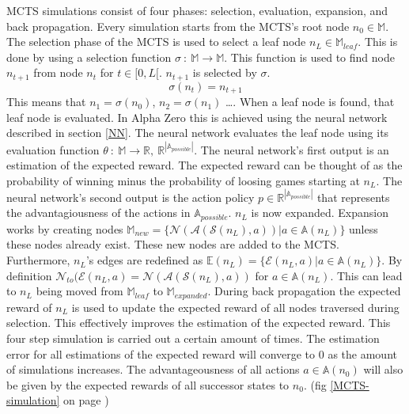 \documentclass[12pt]{article}
\newcommand{\imgRef}[1]{(fig \ref{#1} on page \pageref{#1})}
\begin{document}
MCTS simulations consist of four phases: selection, evaluation, expansion, and back propagation. Every simulation starts from the MCTS's root node \(n_0 \in \mathbb{M}\). The selection phase of the MCTS is used to select a leaf node \(n_L \in \mathbb{M}_{leaf}\). This is done by using a selection function \(\sigma~:~\mathbb{M}\to\mathbb{M}\). This function is used to find node \(n_{t+1}\) from node \(n_t\) for \(t\in [0,L[\). \(n_{t+1}\) is selected by \(\sigma\).
\begin{equation}
\sigma(n_t) = n_{t+1}
\end{equation}
 This means that \(n_1 = \sigma(n_0)\), \(n_2 =  \sigma(n_1)\) \dots. When a leaf node is found, that leaf node is evaluated. In Alpha Zero this is achieved using the neural network described in section \ref{NN}. The neural network evaluates the leaf node using its evaluation function \(\theta~:~\mathbb{M}\to \mathbb{R},~\mathbb{R}^{|\mathbb{A}_{possible}|}\). The neural network's first output is an estimation of the expected reward. The expected reward can be thought of as the probability of winning minus the probability of loosing games starting at \(n_L\). The neural network's second output is the action policy \(p\in\mathbb{R}^{|\mathbb{A}_{possible}|}\) that represents the advantagiousness of the actions in \(\mathbb{A}_{possible}\). \(n_L\) is now expanded. Expansion works by creating nodes \(\mathbb{M}_{new} = \{\mathcal{N}(\mathcal{A}(\mathcal{S}(n_L), a)) | a \in \mathbb{A}(n_L)\}\) unless these nodes already exist. These new nodes are added to the MCTS. Furthermore, \(n_L\)'s edges are redefined as \(\mathbb{E}(n_L) = \{\mathcal{E}(n_L, a) | a \in \mathbb{A}(n_L)\}\). By definition \(\mathcal{N}_{to}(\mathcal{E}(n_L, a) = \mathcal{N}(\mathcal{A}(\mathcal{S}(n_L), a))\) for \(a\in\mathbb{A}(n_L)\). This can lead to \(n_L\) being moved from \(\mathbb{M}_{leaf}\) to \(\mathbb{M}_{expanded}\). During back propagation the expected reward of \(n_L\) is used to update the expected reward of all nodes traversed during selection. This effectively improves the estimation of the expected reward. This four step simulation is carried out a certain amount of times. The estimation error for all estimations of the expected reward will converge to \(0\) as the amount of simulations increases. The advantageousness of all actions \(a  \in \mathbb{A}(n_0)\) will also be given by the expected rewards of all successor states to \(n_0\). \imgRef{MCTS-simulation}
\end{document}
